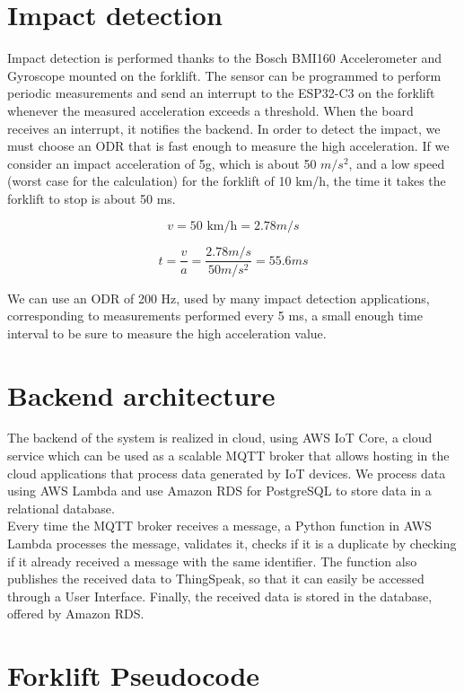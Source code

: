 \section{Impact detection}
Impact detection is performed thanks to the Bosch BMI160 Accelerometer and Gyroscope mounted on the forklift. The sensor can be programmed to perform periodic measurements and send an interrupt to the ESP32-C3 on the forklift whenever the measured acceleration exceeds a threshold. When the board receives an interrupt, it notifies the backend. In order to detect the impact, we must choose an ODR that is fast enough to measure the high acceleration.  If we consider an impact acceleration of 5g, which is about 50 $m/s^2$, and a low  speed (worst case for the calculation) for the forklift of 10 km/h, the time it takes the forklift to stop is about 50 ms.

\begin{equation}
v = 50 \text{ km/h} = 2.78 m/s
\end{equation}

\begin{equation}
t = \frac{v}{a} = \frac{2.78 m/s}{50 m/s^2} = 55.6 ms
\end{equation}

We can use an ODR of 200 Hz, used by many impact detection applications, corresponding to measurements performed every 5 ms, a small enough time interval to be sure to measure the high acceleration value.

\section{Backend architecture}
The backend of the system is realized in cloud, using AWS IoT Core, a cloud service which can be used as a scalable MQTT broker that allows hosting in the cloud applications that process data generated by IoT devices. We process data using AWS Lambda and use Amazon RDS for PostgreSQL to store data in a relational database.\\
Every time the MQTT broker receives a message, a Python function in AWS Lambda processes the message, validates it, checks if it is a duplicate by checking if it already received a message with the same identifier. The function also publishes the received data to ThingSpeak, so that it can easily be accessed through a User Interface. Finally, the received data is stored in the database, offered by Amazon RDS.


\pagebreak
\section{Forklift Pseudocode}
